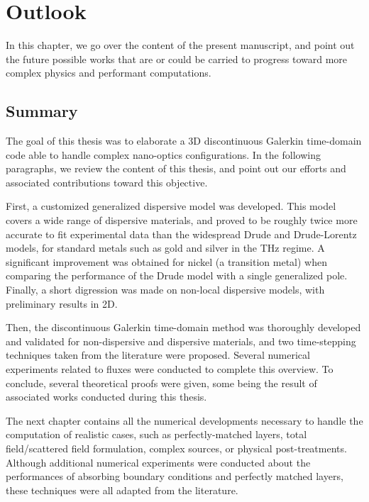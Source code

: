 \chapter{Outlook}

In this chapter, we go over the content of the present manuscript, and point out the future possible works that are or could be carried to progress toward more complex physics and performant computations.

\section{Summary}

The goal of this thesis was to elaborate a 3D discontinuous Galerkin time-domain code able to handle complex nano-optics configurations. In the following paragraphs, we review the content of this thesis, and point out our efforts and associated contributions toward this objective.

First, a customized generalized dispersive model was developed. This model covers a wide range of dispersive materials, and proved to be roughly twice more accurate to fit experimental data than the widespread Drude and Drude-Lorentz models, for standard metals such as gold and silver in the THz regime. A significant improvement was obtained for nickel (a transition metal) when comparing the performance of the Drude model with a single generalized pole. Finally, a short digression was made on non-local dispersive models, with preliminary results in 2D.

Then, the discontinuous Galerkin time-domain method was thoroughly developed and validated for non-dispersive and dispersive materials, and two time-stepping techniques taken from the literature were proposed. Several numerical experiments related to fluxes were conducted to complete this overview. To conclude, several theoretical proofs were given, some being the result of associated works conducted during this thesis.

The next chapter contains all the numerical developments necessary to handle the computation of realistic cases, such as perfectly-matched layers, total field/scattered field formulation, complex sources, or physical post-treatments. Although additional numerical experiments were conducted about the performances of absorbing boundary conditions and perfectly matched layers, these techniques were all adapted from the literature.


